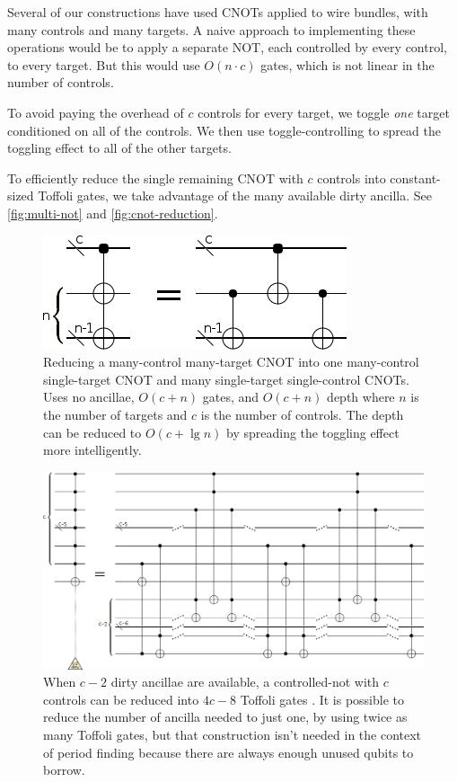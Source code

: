 \documentclass[twocolumn,longbibliography]{quantumarticle-customized}
\begin{document}
Several of our constructions have used CNOTs applied to wire bundles, with many controls and many targets.
A naive approach to implementing these operations would be to apply a separate NOT, each controlled by every control, to every target.
But this would use $O(n \cdot c)$ gates, which is not linear in the number of controls.

To avoid paying the overhead of $c$ controls for every target, we toggle {\em one} target conditioned on all of the controls.
We then use toggle-controlling to spread the toggling effect to all of the other targets.

To efficiently reduce the single remaining CNOT with $c$ controls into constant-sized Toffoli gates, we take advantage of the many available dirty ancilla.
See \autoref{fig:multi-not} and \autoref{fig:cnot-reduction}.

\begin{figure}
  \centering
  \includegraphics[width=\linewidth]{assets/multi-cnot-to-single-cnots.png}
  \caption{
    Reducing a many-control many-target CNOT into one many-control single-target CNOT and many single-target single-control CNOTs.
    Uses no ancillae, $O(c + n)$ gates, and $O(c + n)$ depth where $n$ is the number of targets and $c$ is the number of controls.
    The depth can be reduced to $O(c + \lg n)$ by spreading the toggling effect more intelligently.
  }
  \label{fig:multi-not}
\end{figure}

\begin{figure}
  \centering
  \includegraphics[width=\linewidth]{assets/cnot-reduction.png}
  \caption{
    When $c-2$ dirty ancillae are available, a controlled-not with $c$ controls can be reduced into $4c - 8$ Toffoli gates \cite{barenco1995}.
    It is possible to reduce the number of ancilla needed to just one, by using twice as many Toffoli gates, but that construction isn't needed in the context of period finding because there are always enough unused qubits to borrow.
  }
  \label{fig:cnot-reduction}
\end{figure}
\end{document}
